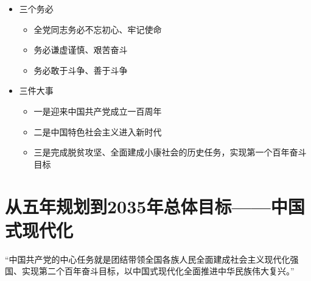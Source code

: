 \documentclass[
]{ctexart}
\providecommand{\tightlist}{%
  \setlength{\itemsep}{0pt}\setlength{\parskip}{0pt}}
\begin{document}
\begin{itemize}
\tightlist
\item
  三个务必

  \begin{itemize}
  \tightlist
  \item
    全党同志务必不忘初心、牢记使命
  \item
    务必谦虚谨慎、艰苦奋斗
  \item
    务必敢于斗争、善于斗争
  \end{itemize}
\item
  三件大事

  \begin{itemize}
  \tightlist
  \item
    一是迎来中国共产党成立一百周年
  \item
    二是中国特色社会主义进入新时代
  \item
    三是完成脱贫攻坚、全面建成小康社会的历史任务，实现第一个百年奋斗目标
  \end{itemize}
\end{itemize}

\hypertarget{ux4eceux4e94ux5e74ux89c4ux5212ux52302035ux5e74ux603bux4f53ux76eeux6807ux4e2dux56fdux5f0fux73b0ux4ee3ux5316}{%
\section{从五年规划到2035年总体目标------中国式现代化}\label{ux4eceux4e94ux5e74ux89c4ux5212ux52302035ux5e74ux603bux4f53ux76eeux6807ux4e2dux56fdux5f0fux73b0ux4ee3ux5316}}

``中国共产党的中心任务就是团结带领全国各族人民全面建成社会主义现代化强国、实现第二个百年奋斗目标，以中国式现代化全面推进中华民族伟大复兴。''
\end{document}
